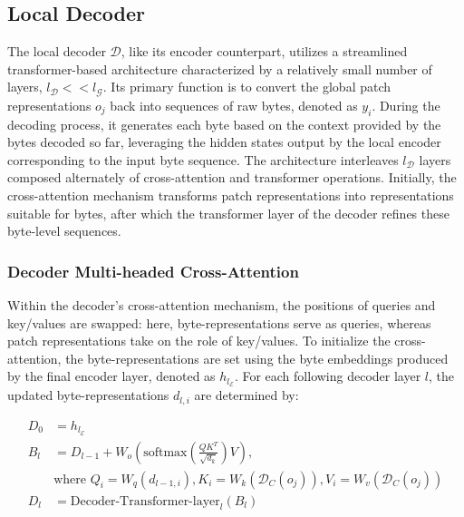 \subsection{Local Decoder} 

The local decoder $\mathcal{D}$, like its encoder counterpart, utilizes a streamlined transformer-based architecture characterized by a relatively small number of layers, $l_{\mathcal{D}} << l_{\mathcal{G}}$. Its primary function is to convert the global patch representations $o_j$ back into sequences of raw bytes, denoted as $y_i$. During the decoding process, it generates each byte based on the context provided by the bytes decoded so far, leveraging the hidden states output by the local encoder corresponding to the input byte sequence. The architecture interleaves $l_{\mathcal{D}}$ layers composed alternately of cross-attention and transformer operations. Initially, the cross-attention mechanism transforms patch representations into representations suitable for bytes, after which the transformer layer of the decoder refines these byte-level sequences.

\subsubsection{Decoder Multi-headed Cross-Attention} 

Within the decoder’s cross-attention mechanism, the positions of queries and key/values are swapped: here, byte-representations serve as queries, whereas patch representations take on the role of key/values. To initialize the cross-attention, the byte-representations are set using the byte embeddings produced by the final encoder layer, denoted as $h_{l_{\mathcal{E}}}$. For each following decoder layer $l$, the updated byte-representations $d_{l,i}$ are determined by:

\begin{align}
D_0 &= h_{l_{\mathcal{E}}} \\
B_l &= D_{l-1} + W_o\left(\text{softmax}\left(\frac{QK^T}{\sqrt{d_k}}\right)V\right), \\
  &\text{where } Q_i = W_q(d_{l-1,i}), K_i = W_k(\mathcal{D}_C(o_j)), V_i = W_v(\mathcal{D}_C(o_j)) \\
  D_l &= \text{Decoder-Transformer-layer}_l(B_l)
\end{align}


